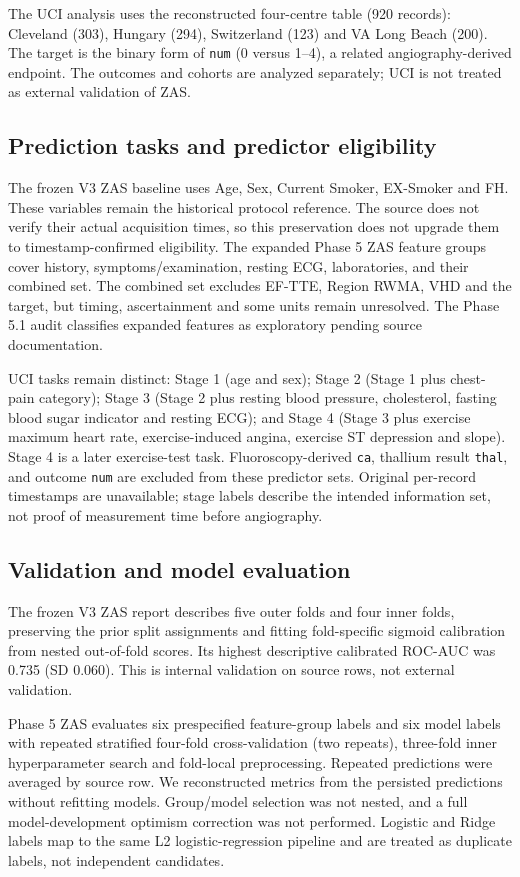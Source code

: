 \documentclass[11pt]{article}
\begin{document}
The UCI analysis uses the reconstructed four-centre table (920 records): Cleveland (303), Hungary (294), Switzerland (123) and VA Long Beach (200). The target is the binary form of \texttt{num} (0 versus 1--4), a related angiography-derived endpoint. The outcomes and cohorts are analyzed separately; UCI is not treated as external validation of ZAS.

\subsection{Prediction tasks and predictor eligibility}
The frozen V3 ZAS baseline uses Age, Sex, Current Smoker, EX-Smoker and FH. These variables remain the historical protocol reference. The source does not verify their actual acquisition times, so this preservation does not upgrade them to timestamp-confirmed eligibility. The expanded Phase 5 ZAS feature groups cover history, symptoms/examination, resting ECG, laboratories, and their combined set. The combined set excludes EF-TTE, Region RWMA, VHD and the target, but timing, ascertainment and some units remain unresolved. The Phase 5.1 audit classifies expanded features as exploratory pending source documentation.

UCI tasks remain distinct: Stage 1 (age and sex); Stage 2 (Stage 1 plus chest-pain category); Stage 3 (Stage 2 plus resting blood pressure, cholesterol, fasting blood sugar indicator and resting ECG); and Stage 4 (Stage 3 plus exercise maximum heart rate, exercise-induced angina, exercise ST depression and slope). Stage 4 is a later exercise-test task. Fluoroscopy-derived \texttt{ca}, thallium result \texttt{thal}, and outcome \texttt{num} are excluded from these predictor sets. Original per-record timestamps are unavailable; stage labels describe the intended information set, not proof of measurement time before angiography.

\subsection{Validation and model evaluation}
The frozen V3 ZAS report describes five outer folds and four inner folds, preserving the prior split assignments and fitting fold-specific sigmoid calibration from nested out-of-fold scores. Its highest descriptive calibrated ROC-AUC was 0.735 (SD 0.060). This is internal validation on source rows, not external validation.

Phase 5 ZAS evaluates six prespecified feature-group labels and six model labels with repeated stratified four-fold cross-validation (two repeats), three-fold inner hyperparameter search and fold-local preprocessing. Repeated predictions were averaged by source row. We reconstructed metrics from the persisted predictions without refitting models. Group/model selection was not nested, and a full model-development optimism correction was not performed. Logistic and Ridge labels map to the same L2 logistic-regression pipeline and are treated as duplicate labels, not independent candidates.
\end{document}
